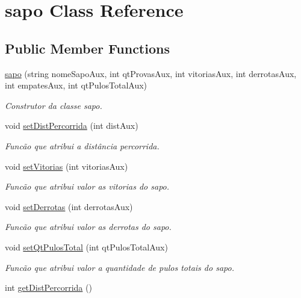 \hypertarget{classsapo}{}\section{sapo Class Reference}
\label{classsapo}
\subsection*{Public Member Functions}
\begin{DoxyCompactItemize}
\item 
\hyperlink{classsapo_aa385ca1864a6acbecc08071f45816a11}{sapo} (string nome\+Sapo\+Aux, int qt\+Provas\+Aux, int vitorias\+Aux, int derrotas\+Aux, int empates\+Aux, int qt\+Pulos\+Total\+Aux)
\begin{DoxyCompactList}\small\item\em Construtor da classe sapo. \end{DoxyCompactList}\item 
void \hyperlink{classsapo_a9bdff42973c9e79e8ab2f17ec7ddcc37}{set\+Dist\+Percorrida} (int dist\+Aux)
\begin{DoxyCompactList}\small\item\em Funcão que atribui a distância percorrida. \end{DoxyCompactList}\item 
void \hyperlink{classsapo_ac5cc63d42dcc3dfa1bc128cabd305acf}{set\+Vitorias} (int vitorias\+Aux)
\begin{DoxyCompactList}\small\item\em Funcão que atribui valor as vitorias do sapo. \end{DoxyCompactList}\item 
void \hyperlink{classsapo_ac44da778fa2e7fc3c117b980bb4c164e}{set\+Derrotas} (int derrotas\+Aux)
\begin{DoxyCompactList}\small\item\em Funcão que atribui valor as derrotas do sapo. \end{DoxyCompactList}\item 
void \hyperlink{classsapo_ac09dd07c9e1aaafe50085de3bf9586ce}{set\+Qt\+Pulos\+Total} (int qt\+Pulos\+Total\+Aux)
\begin{DoxyCompactList}\small\item\em Funcão que atribui valor a quantidade de pulos totais do sapo. \end{DoxyCompactList}\item 
int \hyperlink{classsapo_a58f18fe83a242cc3defec2b1f6859f56}{get\+Dist\+Percorrida} ()

\end{DoxyCompactItemize}
